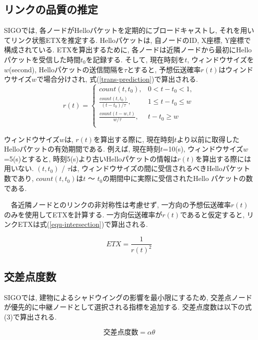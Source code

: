 \documentclass[technicalreport]{ieicej}
\begin{document}
\subsection{リンクの品質の推定}
SIGOでは, 各ノードがHelloパケットを定期的にブロードキャストし, それを用いてリンク状態ETXを推定する. Helloパケットは, 自ノードのID, X座標, Y座標で構成されている. ETXを算出するために, 各ノードは近隣ノードから最初にHelloパケットを受信した時間$t_{0}$を記録する. そして, 現在時刻を$t$, ウィンドウサイズを$w$(second), Helloパケットの送信間隔を$τ$とすると, 予想伝送確率$r(t)$はウィンドウサイズ$w$で場合分けされ, 式(\ref{trans-prediction})で算出される.
\begin{equation}
\label{trans-prediction}
r(t) =\begin{cases}count(t, t_{0}), & 0 < t - t_{0} < 1,  \\ \frac{count(t,t_{0})}{(t-t_{0}) / τ}, & 1 \leq t - t_{0} \leq w\\
\frac{count(t - w,t)}{w / τ}, &  t - t_{0} \geq w\\
\end{cases}
\end{equation}



ウィンドウサイズ$w$は, $r(t)$を算出する際に, 現在時刻$t$より以前に取得したHelloパケットの有効期間である. 例えば, 現在時刻$t$=10(s), ウィンドウサイズ$w$=5(s)とすると, 時刻5(s)より古いHelloパケットの情報は$r(t)$を算出する際には用いない. $(t,t_{0})$ / $τ$は, ウィンドウサイズの間に受信されるべきHelloパケット数であり, $count(t,t_{0})$は$t$ ～ $t_{0}$の期間中に実際に受信されたHello パケットの数である. \par
　各近隣ノードとのリンクの非対称性は考慮せず, 一方向の予想伝送確率$r(t)$のみを使用してETXを計算する. 一方向伝送確率が$r(t)$であると仮定すると, リンクETXは式(\ref{equ-intersection})で算出される.
 
 \begin{equation}
 \label{equ-intersection}
 ETX = \frac{1}{  {r(t)}^{2}   } 
 \end{equation}

\subsection{交差点度数}
SIGOでは, 建物によるシャドウイングの影響を最小限にするため, 交差点ノードが優先的に中継ノードとして選択される指標を追加する. 交差点度数は以下の式(3)で算出される.

\begin{equation}
 交差点度数 = αθ
 \end{equation}
 
\end{document}

